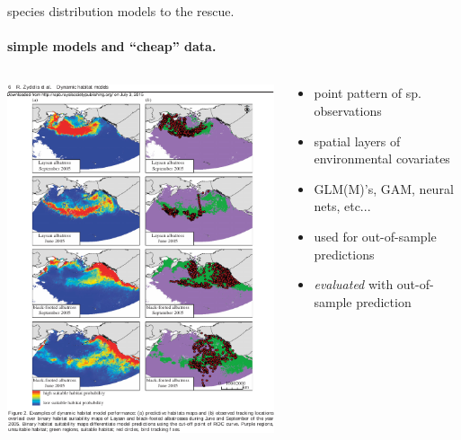\documentclass[show notes]{beamer}
\begin{document}
\begin{frame}{species distribution models to the rescue.}
  \framesubtitle{simple models and ``cheap'' data.} 
  
  \begin{columns}
  \begin{column}{.4\textwidth}
   \includegraphics[width=\textwidth]{habitat-suitability.pdf}
  \end{column}
  \begin{column}{.6\textwidth}
  	\begin{itemize}
    \item point pattern of sp. observations
    \item spatial layers of environmental covariates
    \item GLM(M)'s, GAM, neural nets, etc...
    \item used for out-of-sample predictions
    \item \emph{evaluated} with out-of-sample prediction
    \end{itemize}
  \end{column}
  \end{columns}
\end{frame}
\end{document}

